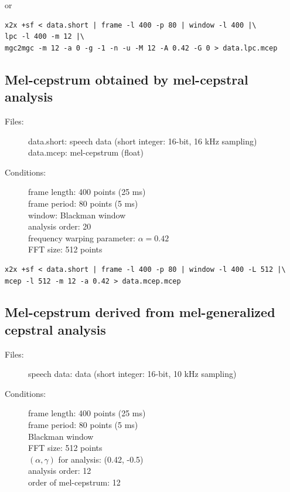 \documentclass[a4paper,10pt]{article}
\begin{document}
or

\begin{verbatim}
x2x +sf < data.short | frame -l 400 -p 80 | window -l 400 |\
lpc -l 400 -m 12 |\
mgc2mgc -m 12 -a 0 -g -1 -n -u -M 12 -A 0.42 -G 0 > data.lpc.mcep
\end{verbatim}

\subsection{Mel-cepstrum obtained by mel-cepstral analysis}

\begin{description}
\item[Files:]
  data.short: speech data (short integer: 16-bit, 16 kHz sampling)\\
  data.mcep: mel-cepstrum (float)
\item[Conditions:]
  frame length: 400 points (25 ms)\\
  frame period: 80 points (5 ms)\\
  window: Blackman window\\
  analysis order: 20 \\
  frequency warping parameter: $\alpha = 0.42$\\
  FFT size: 512 points
\end{description}

\begin{verbatim}
x2x +sf < data.short | frame -l 400 -p 80 | window -l 400 -L 512 |\
mcep -l 512 -m 12 -a 0.42 > data.mcep.mcep
\end{verbatim}

\subsection{Mel-cepstrum derived from mel-generalized cepstral analysis}

\begin{description}
\item[Files:]
   speech data: data (short integer: 16-bit, 10 kHz sampling)\\
\item[Conditions:]
  frame length: 400 points (25 ms)\\
  frame period: 80 points (5 ms)\\
  Blackman window\\
  FFT size: 512 points\\
  $(\alpha, \gamma)$ for analysis: (0.42, -0.5)\\
  analysis order: 12\\
  order of mel-cepstrum: 12
\end{description}
\end{document}

